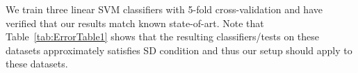 We train three linear SVM classifiers with 5-fold cross-validation and have verified that our results match known state-of-art. Note that Table~\ref{tab:ErrorTable1} shows that the resulting classifiers/tests on these datasets approximately satisfies SD condition and thus our setup should apply to these datasets. 
%
%
%
%
%
